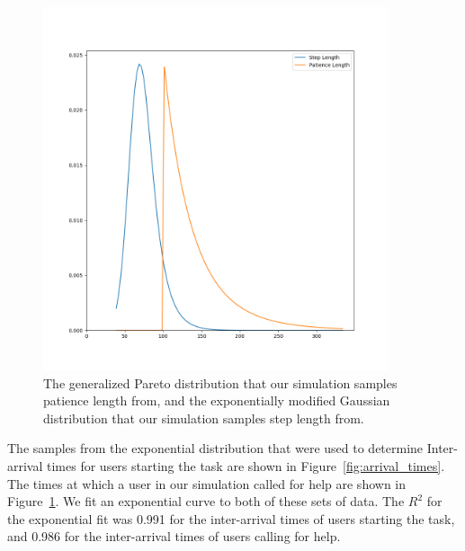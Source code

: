 \begin{figure}[h]
  \includegraphics[width=4in]{figures/montecarlo/step_patience.png}
  \caption{
    The generalized Pareto distribution that our simulation samples patience
    length from, and the exponentially modified Gaussian distribution that our
    simulation samples step length from.
  }\label{fig:step_patience}
\end{figure}

The samples from the exponential distribution that were used to determine
Inter-arrival times for users starting the task are shown in
Figure~\ref{fig:arrival_times}.
The times at which a user in our simulation called for help are shown in
Figure~\ref{fig:step_patience}.
We fit an exponential curve to both of these sets of data.
The $R^2$ for the exponential fit was 0.991 for the inter-arrival times of users
starting the task, and 0.986 for the inter-arrival times of users calling for
help.

